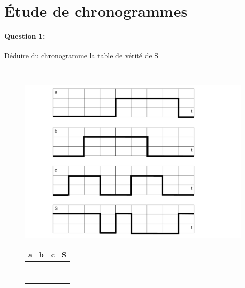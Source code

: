 

\section{Étude de chronogrammes}

\paragraph{Question 1:} Déduire du chronogramme la table de vérité de S 

~\

\begin{figure}[!h]
 \begin{minipage}{0.6\linewidth}
    \centering\includegraphics[width=1\linewidth]{img/chrono.pdf}
 \end{minipage}
 \hfill
 \begin{minipage}{0.38\linewidth}
 \begin{center}
 \begin{tabular}{|c|c|c|c|}
 \hline
 a & b & c & S \\
 \hline
   &   &   &   \\
 \hline
   &   &   &   \\
 \hline
   &   &   &   \\
 \hline
   &   &   &   \\
 \hline
   &   &   &   \\
 \hline
   &   &   &   \\
 \hline
   &   &   &   \\
 \hline
   &   &   &   \\
 \hline
 \end{tabular}
 \end{center}
 \end{minipage}
\end{figure}



